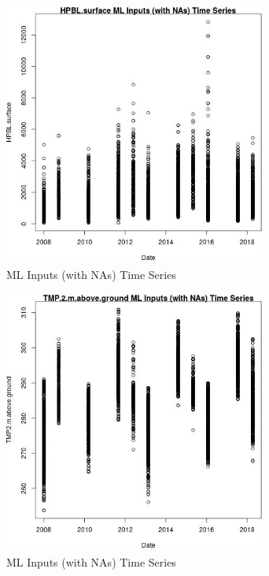 \begin{figure} 
\centering  
\includegraphics[width=0.77\textwidth]{Code_Outputs/Report_ML_input_PM25_Step4_part_e_de_duplicated_aves_compiled_2019-05-18wNAs_HPBLsurfacevDate.jpg} 
\caption{\label{fig:Report_ML_input_PM25_Step4_part_e_de_duplicated_aves_compiled_2019-05-18wNAsHPBLsurfacevDate}ML Inputs (with NAs) Time Series} 
\end{figure} 
 

\begin{figure} 
\centering  
\includegraphics[width=0.77\textwidth]{Code_Outputs/Report_ML_input_PM25_Step4_part_e_de_duplicated_aves_compiled_2019-05-18wNAs_TMP2mabovegroundvDate.jpg} 
\caption{\label{fig:Report_ML_input_PM25_Step4_part_e_de_duplicated_aves_compiled_2019-05-18wNAsTMP2mabovegroundvDate}ML Inputs (with NAs) Time Series} 
\end{figure} 
 

